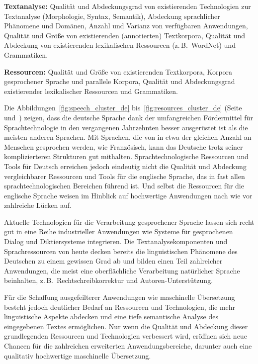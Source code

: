 \documentclass[]{../../metanetpaper}
\begin{document}
\begin{multicols}{2}
\textbf{Textanalyse:} Qualität und Abdeckungsgrad von existierenden Technologien zur Textanalyse (Morphologie, Syntax, Semantik), Abdeckung sprachlicher Phänomene und Domänen, Anzahl und Varianz von verfügbaren Anwendungen, Qualität und Größe von existierenden (annotierten) Textkorpora, Qualität und Abdeckung von existierenden lexikalischen Ressourcen (z.\,B.~WordNet) und Grammatiken.

\textbf{Ressourcen:} Qualität und Größe von existierenden Textkorpora, Korpora gesprochener Sprache und parallele Korpora, Qualität und Abdeckungsgrad existierender lexikalischer Ressourcen und Grammatiken.

Die Abbildungen~\ref{fig:speech_cluster_de} bis~\ref{fig:resources_cluster_de} (Seite~\pageref{fig:speech_cluster_de} und~\pageref{fig:resources_cluster_de}) zeigen, dass die deutsche Sprache dank der umfangreichen Fördermittel für Sprachtechnologie in den vergangenen Jahrzehnten besser ausgerüstet ist als die meisten anderen Sprachen. Mit Sprachen, die von in etwa der gleichen Anzahl an Menschen gesprochen werden, wie Französisch, kann das Deutsche trotz seiner komplizierteren Strukturen gut mithalten. Sprachtechnologische Ressourcen und Tools für Deutsch erreichen jedoch eindeutig nicht die Qualität und Abdeckung vergleichbarer Ressourcen und Tools für die englische Sprache, das in fast allen sprachtechnologischen Bereichen führend ist. Und selbst die Ressourcen für die englische Sprache weisen im Hinblick auf hochwertige Anwendungen nach wie vor zahlreiche Lücken auf.

Aktuelle Technologien für die Verarbeitung gesprochener Sprache lassen sich recht gut in eine Reihe industrieller Anwendungen wie Systeme für gesprochenen Dialog und Diktiersysteme integrieren. Die Textanalysekomponenten und Sprachressourcen von heute decken bereits die linguistischen Phänomene des Deutschen zu einem gewissen Grad ab und bilden einen Teil zahlreicher Anwendungen, die meist eine oberflächliche Verarbeitung natürlicher Sprache beinhalten, z.\,B.~Rechtschreibkorrektur und Autoren-Unterstützung.

Für die Schaffung ausgefeilterer Anwendungen wie maschinelle Übersetzung besteht jedoch deutlicher Bedarf an Ressourcen und Technologien, die mehr linguistische Aspekte abdecken und eine tiefe semantische Analyse des eingegebenen Textes ermöglichen. Nur wenn die Qualität und Abdeckung dieser grundlegenden Ressourcen und Technologien verbessert wird, eröffnen sich neue Chancen für die zahlreichen erweiterten Anwendungsbereiche, darunter auch eine qualitativ hochwertige maschinelle Übersetzung.


\end{multicols}
\end{document}
